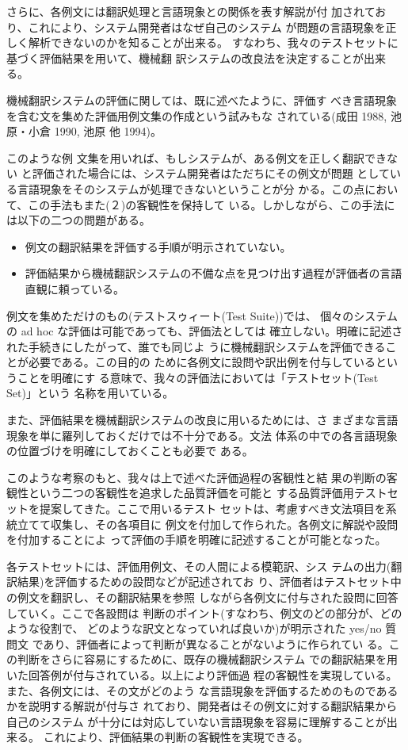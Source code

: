 さらに、各例文には翻訳処理と言語現象との関係を表す解説が付
加されており、これにより、システム開発者はなぜ自己のシステム
が問題の言語現象を正しく解析できないのかを知ることが出来る。
すなわち、我々のテストセットに基づく評価結果を用いて、機械翻
訳システムの改良法を決定することが出来る。

機械翻訳システムの評価に関しては、既に述べたように、評価す
べき言語現象を含む文を集めた評価用例文集の作成という試みもな
されている(成田 1988, 池原・小倉 1990, 池原 他 1994)。

このような例
文集を用いれば、もしシステムが、ある例文を正しく翻訳できない
と評価された場合には、システム開発者はただちにその例文が問題
としている言語現象をそのシステムが処理できないということが分
かる。この点において、この手法もまた(２)の客観性を保持して
いる。しかしながら、この手法には以下の二つの問題がある。\\


\begin{itemize}
\item 例文の翻訳結果を評価する手順が明示されていない。
\item 評価結果から機械翻訳システムの不備な点を見つけ出す過程が評価者の言語直観に頼っている。\\
\end{itemize}


例文を集めただけのもの(テストスゥィート(Test Suite))では、
個々のシステムの ad hoc な評価は可能であっても、評価法としては
確立しない。明確に記述された手続きにしたがって、誰でも同じよ
うに機械翻訳システムを評価できることが必要である。この目的の
ために各例文に設問や訳出例を付与しているということを明確にす
る意味で、我々の評価法においては「テストセット(Test Set)」という
名称を用いている。

また、評価結果を機械翻訳システムの改良に用いるためには、さ
まざまな言語現象を単に羅列しておくだけでは不十分である。文法
体系の中での各言語現象の位置づけを明確にしておくことも必要で
ある。

このような考察のもと、我々は上で述べた評価過程の客観性と結
果の判断の客観性という二つの客観性を追求した品質評価を可能と
する品質評価用テストセットを提案してきた。ここで用いるテスト
セットは、考慮すべき文法項目を系統立てて収集し、その各項目に
例文を付加して作られた。各例文に解説や設問を付加することによ
って評価の手順を明確に記述することが可能となった。

各テストセットには、評価用例文、その人間による模範訳、シス
テムの出力(翻訳結果)を評価するための設問などが記述されてお
り、評価者はテストセット中の例文を翻訳し、その翻訳結果を参照
しながら各例文に付与された設問に回答していく。ここで各設問は
判断のポイント(すなわち、例文のどの部分が、どのような役割で、
どのような訳文となっていれば良いか)が明示された yes/no 質問文
であり、評価者によって判断が異なることがないように作られてい
る。この判断をさらに容易にするために、既存の機械翻訳システム
での翻訳結果を用いた回答例が付与されている。以上により評価過
程の客観性を実現している。また、各例文には、その文がどのよう
な言語現象を評価するためのものであるかを説明する解説が付与さ
れており、開発者はその例文に対する翻訳結果から自己のシステム
が十分には対応していない言語現象を容易に理解することが出来る。
これにより、評価結果の判断の客観性を実現できる。


